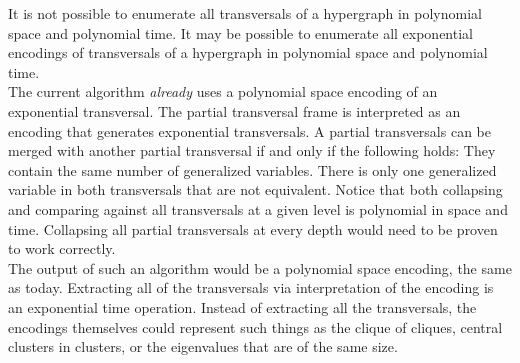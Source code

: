 It is not possible to enumerate all transversals of a hypergraph in polynomial space and polynomial time. It may be possible to enumerate all exponential encodings of transversals of a hypergraph in polynomial space and polynomial time. \\

The current algorithm \textit{already} uses a polynomial space encoding of an exponential transversal. The partial transversal frame is interpreted as an encoding that generates exponential transversals. A partial transversals can be merged with another partial transversal if and only if the following holds: They contain the same number of generalized variables. There is only one generalized variable in both transversals that are not equivalent. Notice that both collapsing and comparing against all transversals at a given level is polynomial in space and time. Collapsing all partial transversals at every depth would need to be proven to work correctly.\\

The output of such an algorithm would be a polynomial space encoding, the same as today. Extracting all of the transversals via interpretation of the encoding is an exponential time operation. Instead of extracting all the transversals, the encodings themselves could represent such things as the clique of cliques, central clusters in clusters, or the eigenvalues that are of the same size.\\

